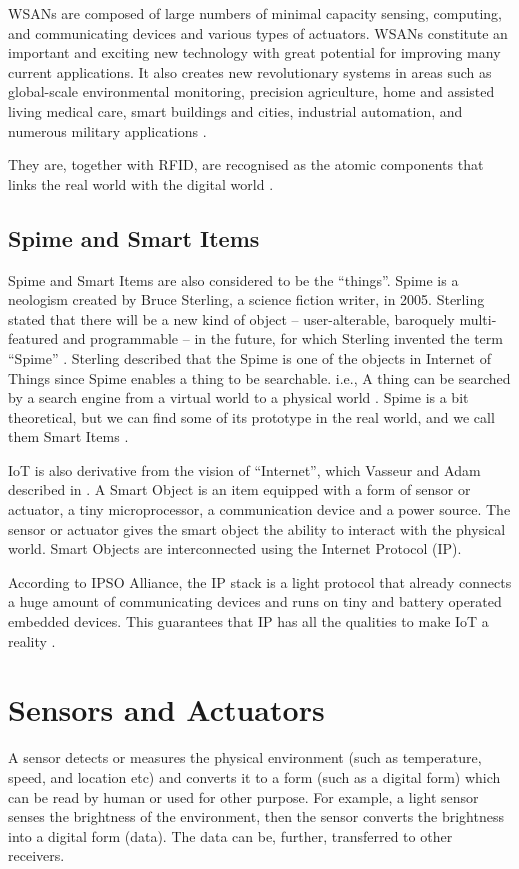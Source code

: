 WSANs are composed of large numbers of minimal capacity sensing, computing, and communicating devices and various types of actuators. WSANs constitute an important and exciting new technology with great potential for improving many current applications. It also creates new revolutionary systems in areas such as global-scale environmental monitoring, precision agriculture, home and assisted living medical care, smart buildings and cities, industrial automation, and numerous military applications \cite{stankovic2008sensor}. 

They are, together with RFID, are recognised as the atomic components that links the real world with the digital world \cite{sterling2005shaping}.

\subsection{Spime and Smart Items}

Spime and Smart Items are also considered to be the ``things''. Spime is a neologism created by Bruce Sterling, a science fiction writer, in 2005. Sterling stated that there will be a new kind of object -- user-alterable, baroquely multi-featured and programmable -- in the future, for which Sterling invented the term ``Spime'' \cite{sterling2005shaping}. Sterling described that the Spime is one of the objects in Internet of Things since Spime enables a thing to be searchable. i.e., A thing can be searched by a search engine from a virtual world to a physical world \cite{sterling2005shaping}. Spime is a bit theoretical, but we can find some of its prototype in the real world, and we call them Smart Items \cite{atzori2010internet}.

IoT is also derivative from the vision of ``Internet'', which Vasseur and Adam described in \cite{vasseur2010interconnecting}. A Smart Object is an item equipped with a form of sensor or actuator, a tiny microprocessor, a communication device and a power source. The sensor or actuator gives the smart object the ability to interact with the physical world. Smart Objects are interconnected using the Internet Protocol (IP). 

According to IPSO Alliance, the IP stack is a light protocol that already connects a huge amount of communicating devices and runs on tiny and battery operated embedded devices. This guarantees that IP has all the qualities to make IoT a reality \cite{atzori2010internet}.

\section{Sensors and Actuators}
A sensor detects or measures the physical environment (such as temperature, speed, and location etc) and converts it to a form (such as a digital form) which can be read by human or used for other purpose. For example, a light sensor senses the brightness of the environment, then the sensor converts the brightness into a digital form (data). The data can be, further, transferred to other receivers.

